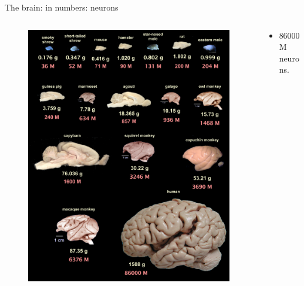 \begin{frame}[t]{The brain: in numbers: neurons}
  \begin{columns}
    \begin{column}{0.5\textwidth}
      \begin{figure}[h]
        \centering
        \includegraphics[width=\textwidth]{99_images/brain-sizes.jpg}
      \end{figure}
    \end{column}
    \begin{column}{0.5\textwidth}
      \begin{itemize}
        \item \alert{86000M} neurons\footnotemark{}.
      \end{itemize}
    \end{column}
  \end{columns}
  \vspace{0.2cm}
\end{frame}
